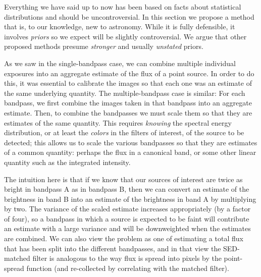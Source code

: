\documentclass[letterpaper,preprint]{aastex62}
\begin{document}
Everything we have said up to now has been based on facts about
statistical distributions and should be uncontroversial.  In this section we
propose a method that is, to our knowledge, new to astronomy.  While
it is fully defensible, it involves \emph{priors} so we expect will be
slightly controversial.  We argue that other proposed methods presume
\emph{stronger} and usually \emph{unstated} priors.

As we saw in the single-bandpass case, we can combine multiple
individual exposures into an aggregate estimate of the flux of a point
source.  In order to do this, it was essential to calibrate the images
so that each one was an estimate of the same underlying quantity.  The
multiple-bandpass case is similar: For each bandpass, we first combine
the images taken in that bandpass into an aggregate estimate.  Then,
to combine the bandpasses we must scale them so that they are
estimates of the same quantity.  This requires \emph{knowing} the
spectral energy distribution, or at least the \emph{colors} in the
filters of interest, of the source to be detected; this allows us to
scale the various bandpasses so that they are estimates of a common
quantity: perhaps the flux in a canonical band, or some other linear
quantity such as the integrated intensity.



The intuition here is that if we know that our sources of interest are
twice as bright in bandpass A as in bandpass B, then we can convert an
estimate of the brightness in band B into an estimate of the
brightness in band A by multiplying by two.  The variance of the
scaled estimate increases appropriately (by a factor of four), so a
bandpass in which a source is expected to be faint will contribute an
estimate with a large variance and will be downweighted when the
estimates are combined.  We can also view the problem as one of
estimating a total flux that has been split into the different
bandpasses, and in that view the SED-matched filter is analogous to
the way flux is spread into pixels by the point-spread function (and
re-collected by correlating with the matched filter).

\newcommand{\sigdj}{\sigma_{j}}
\end{document}
